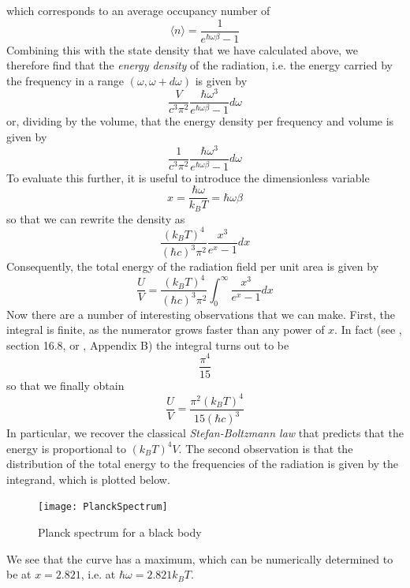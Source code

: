 \documentclass[a4paper, draft]{article}
\theoremstyle{own}
\theoremstyle{remark}
\begin{document}
which corresponds to an average occupancy number of
$$
\langle n \rangle = \frac{1}{e^{\hbar \omega \beta} - 1}
$$
Combining this with the state density that we have calculated above, we therefore find that the {\em energy density} of the radiation, i.e. the energy carried by the frequency in a range $(\omega, \omega + d\omega)$ is given by
$$
\frac{V}{c^3 \pi^2 }  \frac{\hbar \omega^3}{e^{\hbar \omega \beta} - 1}  d\omega
$$
or, dividing by the volume, that the energy density per frequency and volume is given by
$$
\frac{1}{c^3 \pi^2 }  \frac{\hbar \omega^3}{e^{\hbar \omega \beta} - 1}  d\omega
$$
To evaluate this further, it is useful to introduce the dimensionless variable
$$
x = \frac{\hbar \omega}{k_B T} = \hbar \omega \beta 
$$
so that we can rewrite the density as
$$
\frac{(k_B T)^4}{(\hbar c)^3 \pi^2} \frac{x^3}{e^x - 1} dx
$$
Consequently, the total energy of the radiation field per unit area is given by
$$
\frac{U}{V} = \frac{(k_B T)^4}{(\hbar c)^3 \pi^2} \int_0^\infty \frac{x^3}{e^x - 1} dx
$$
Now there are a number of interesting observations that we can make. First, the integral is finite, as the numerator grows faster than any power of $x$. In fact (see \cite{Callen}, section 16.8, or \cite{Schroeder}, Appendix B) the integral turns out to be 
$$
\frac{\pi^4}{15}
$$
so that we finally obtain
$$
\frac{U}{V} = \frac{\pi^2 (k_B T)^4}{15 (\hbar c)^3}
$$
In particular, we recover the classical {\em Stefan-Boltzmann law} that predicts that the energy is proportional to $(k_B T)^4 V$. The second observation is that the distribution of the total energy to the frequencies of the radiation is given by the integrand, which is plotted below.

\begin{figure}[ht]
\centering
\texttt{[image: PlanckSpectrum]}
\caption{Planck spectrum for a black body}
\label{fig:PlankSpectrum}
\end{figure}

We see that the curve has a maximum, which can be numerically determined to be at $x = 2.821$, i.e. at $\hbar \omega = 2.821 k_B T$. 
\end{document}
